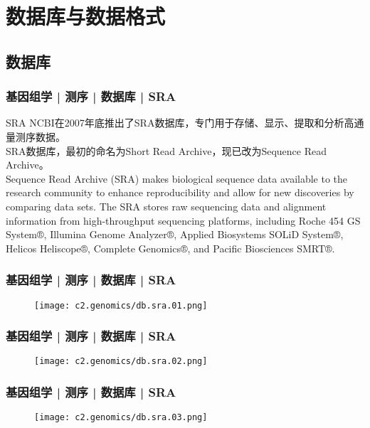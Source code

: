 \section{数据库与数据格式}
\subsection{数据库}
\begin{frame}
  \frametitle{基因组学 | 测序 | 数据库 | SRA}
  \begin{block}{SRA}
NCBI在2007年底推出了SRA数据库，专门用于存储、显示、提取和分析高通量测序数据。\\
\vspace{1em}
SRA数据库，最初的命名为Short Read Archive，现已改为Sequence Read Archive。\\
\vspace{1em}
Sequence Read Archive (SRA) makes biological sequence data available to the research community to enhance reproducibility and allow for new discoveries by comparing data sets. The SRA stores raw sequencing data and alignment information from high-throughput sequencing platforms, including Roche 454 GS System®, Illumina Genome Analyzer®, Applied Biosystems SOLiD System®, Helicos Heliscope®, Complete Genomics®, and Pacific Biosciences SMRT®. 
  \end{block}
\end{frame}
    
\begin{frame}
  \frametitle{基因组学 | 测序 | 数据库 | SRA}
  \begin{figure}
    \centering
    \texttt{[image: c2.genomics/db.sra.01.png]}
  \end{figure}
\end{frame}
    
\begin{frame}
  \frametitle{基因组学 | 测序 | 数据库 | SRA}
  \begin{figure}
    \centering
    \texttt{[image: c2.genomics/db.sra.02.png]}
  \end{figure}
\end{frame}
    
\begin{frame}
  \frametitle{基因组学 | 测序 | 数据库 | SRA}
  \begin{figure}
    \centering
    \texttt{[image: c2.genomics/db.sra.03.png]}
  \end{figure}
\end{frame}
    

